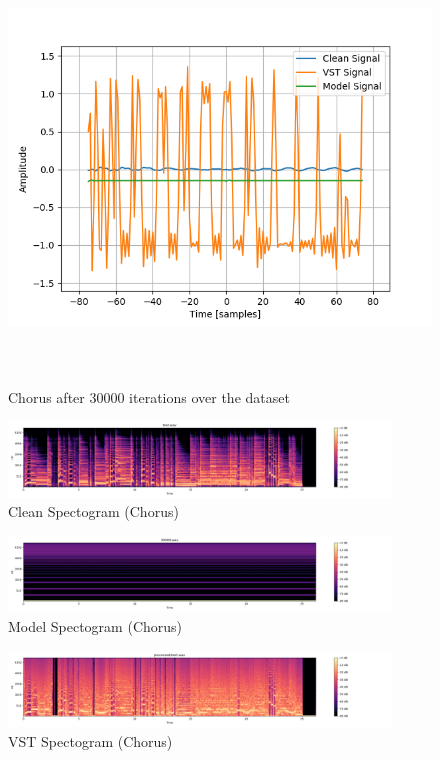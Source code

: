 \documentclass{l4proj}
\begin{document}
\begin{figure}
\centering
\includegraphics[width=6.00000in,height=4.50000in]{images/chorus.png}
\caption{Chorus after 30000 iterations over the
dataset\label{fig:chorus}}
\end{figure}

\begin{figure}
\centering
\includegraphics[width=4.00000in]{images/chorusclean.png}
\caption{Clean Spectogram (Chorus)\label{fig:chorusc}}
\end{figure}

\begin{figure}
\centering
\includegraphics[width=4.00000in]{images/chorusmodel.png}
\caption{Model Spectogram (Chorus)\label{fig:chorusm}}
\end{figure}

\begin{figure}
\centering
\includegraphics[width=4.00000in]{images/chorusvst.png}
\caption{VST Spectogram (Chorus)\label{fig:chorusv}}
\end{figure}
\end{document}
